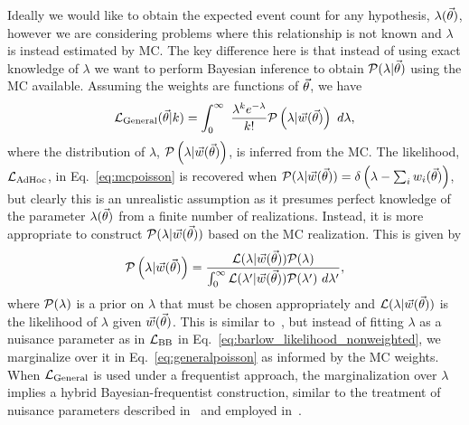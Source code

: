Ideally we would like to obtain the expected event count for any hypothesis, $\lambda(\vec{\theta})$, however we are considering problems where this relationship is not known and $\lambda$ is instead estimated by MC.
The key difference here is that instead of using exact knowledge of $\lambda$ we want to perform Bayesian inference to obtain $\mathcal{P}(\lambda|\vec{\theta})$ using the MC available.
Assuming the weights are functions of $\vec{\theta}$, we have
\begin{equation} \label{eq:generalpoisson}
\mathcal{L}_{\rm General}(\vec{\theta}|k) = \int_{0}^{\infty}~\frac{\lambda^{k}e^{-\lambda}}{k!}\mathcal{P}\left(\lambda|\vec{w}(\vec{\theta})\right)~d\lambda,
\end{equation}
where the distribution of $\lambda$, $\mathcal{P}\left(\lambda|\vec{w}(\vec{\theta})\right)$, is inferred from the MC.
The likelihood, $\mathcal{L}_{\textmd{AdHoc}}$, in Eq.~\eqref{eq:mcpoisson} is recovered when $\mathcal{P}(\lambda|\vec{w}(\vec{\theta})) = \delta\left(\lambda - \sum_{i}{w_i(\vec{\theta})}\right)$, but clearly this is an unrealistic assumption as it presumes perfect knowledge of the parameter $\lambda(\vec{\theta})$ from a finite number of realizations.
Instead, it is more appropriate to construct $\mathcal{P}(\lambda|\vec{w}(\vec{\theta}))$ based on the MC realization.
This is given by
\begin{equation} \label{eq:posterior}
\mathcal{P}\left(\lambda|\vec{w}(\vec{\theta})\right) = \frac{\mathcal{L}(\lambda|\vec{w}(\vec{\theta}))\mathcal{P}(\lambda)}{\int_0^\infty \mathcal{L}(\lambda'|\vec{w}(\vec{\theta}))\mathcal{P}(\lambda')~d\lambda'},
\end{equation}
where $\mathcal{P}(\lambda)$ is a prior on $\lambda$ that must be chosen appropriately and $\mathcal{L}(\lambda|\vec{w}(\vec{\theta}))$ is the likelihood of $\lambda$ given $\vec{w}(\vec{\theta})$.
This is similar to~\cite{Barlow:1993dm, Cranmer:2012sba}, but instead of fitting $\lambda$ as a nuisance parameter as in $\mathcal{L}_{\textmd{BB}}$ in Eq.~\eqref{eq:barlow_likelihood_nonweighted}, we marginalize over it in Eq.~\eqref{eq:generalpoisson} as informed by the MC weights.
When $\mathcal{L}_{\rm General}$ is used under a frequentist approach, the marginalization over $\lambda$ implies a hybrid Bayesian-frequentist construction, similar to the treatment of nuisance parameters described in~\cite{Cousins:1991qz} and employed in~\cite{Abe:2017vif, Abe:2018wpn}.

